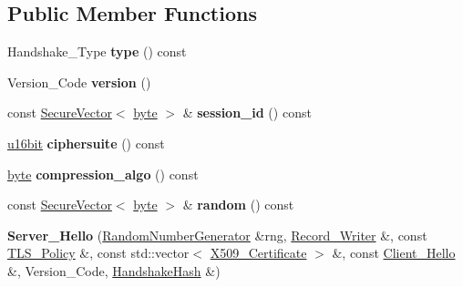 \subsection*{Public Member Functions}
\begin{DoxyCompactItemize}
\item 
\hypertarget{classBotan_1_1Server__Hello_ae34e2f807a4e0663a662ff636ea52e88}{Handshake\-\_\-\-Type {\bfseries type} () const }\label{classBotan_1_1Server__Hello_ae34e2f807a4e0663a662ff636ea52e88}

\item 
\hypertarget{classBotan_1_1Server__Hello_add83e14eeb3a2f143c2f767300372dfa}{Version\-\_\-\-Code {\bfseries version} ()}\label{classBotan_1_1Server__Hello_add83e14eeb3a2f143c2f767300372dfa}

\item 
\hypertarget{classBotan_1_1Server__Hello_afe09669ac0c656a977cbd0322e68836e}{const \hyperlink{classBotan_1_1SecureVector}{Secure\-Vector}$<$ \hyperlink{namespaceBotan_a7d793989d801281df48c6b19616b8b84}{byte} $>$ \& {\bfseries session\-\_\-id} () const }\label{classBotan_1_1Server__Hello_afe09669ac0c656a977cbd0322e68836e}

\item 
\hypertarget{classBotan_1_1Server__Hello_a9968c05e62d4b0575667a77f55ebe69c}{\hyperlink{namespaceBotan_ab07face63a00c39ea6ed97f203ee501c}{u16bit} {\bfseries ciphersuite} () const }\label{classBotan_1_1Server__Hello_a9968c05e62d4b0575667a77f55ebe69c}

\item 
\hypertarget{classBotan_1_1Server__Hello_a9c02ac24037e5f4fefb4e8ac2c476622}{\hyperlink{namespaceBotan_a7d793989d801281df48c6b19616b8b84}{byte} {\bfseries compression\-\_\-algo} () const }\label{classBotan_1_1Server__Hello_a9c02ac24037e5f4fefb4e8ac2c476622}

\item 
\hypertarget{classBotan_1_1Server__Hello_a7477eba21981e3eb24c08974d0ff5ebd}{const \hyperlink{classBotan_1_1SecureVector}{Secure\-Vector}$<$ \hyperlink{namespaceBotan_a7d793989d801281df48c6b19616b8b84}{byte} $>$ \& {\bfseries random} () const }\label{classBotan_1_1Server__Hello_a7477eba21981e3eb24c08974d0ff5ebd}

\item 
\hypertarget{classBotan_1_1Server__Hello_ac5808d3513f90c2e6013772f34386e72}{{\bfseries Server\-\_\-\-Hello} (\hyperlink{classBotan_1_1RandomNumberGenerator}{Random\-Number\-Generator} \&rng, \hyperlink{classBotan_1_1Record__Writer}{Record\-\_\-\-Writer} \&, const \hyperlink{classBotan_1_1TLS__Policy}{T\-L\-S\-\_\-\-Policy} \&, const std\-::vector$<$ \hyperlink{classBotan_1_1X509__Certificate}{X509\-\_\-\-Certificate} $>$ \&, const \hyperlink{classBotan_1_1Client__Hello}{Client\-\_\-\-Hello} \&, Version\-\_\-\-Code, \hyperlink{classBotan_1_1HandshakeHash}{Handshake\-Hash} \&)}\label{classBotan_1_1Server__Hello_ac5808d3513f90c2e6013772f34386e72}


\end{DoxyCompactItemize}
